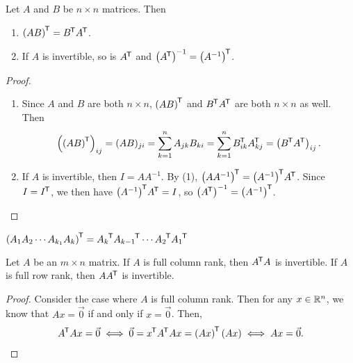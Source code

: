 \begin{thm}\label{transpose-properties}
    Let $A$ and $B$ be $n \times n$ matrices. Then
    \begin{enumerate}[label=(\arabic*)]
        \item ${\left(AB\right)}^{\mkern-1.5mu\mathsf{T}} = {B}^{\mkern-1.5mu\mathsf{T}}{A}^{\mkern-1.5mu\mathsf{T}}$.
        \item If $A$ is invertible, so is ${A}^{\mkern-1.5mu\mathsf{T}}$ and $\left({A}^{\mkern-1.5mu\mathsf{T}}\right)^{-1} = {\left(A^{-1}\right)}^{\mkern-1.5mu\mathsf{T}}$.
    \end{enumerate}
\end{thm}

\begin{proof}\proofbreak
    \begin{enumerate}[label=(\arabic*)]
        \item Since $A$ and $B$ are both $n \times n$, ${(AB)}^{\mkern-1.5mu\mathsf{T}}$ and ${B}^{\mkern-1.5mu\mathsf{T}}{A}^{\mkern-1.5mu\mathsf{T}}$ are both $n \times n$ as well. Then \[\left({\left(AB\right)}^{\mkern-1.5mu\mathsf{T}}\right)_{ij} = (AB)_{ji} = \sum_{k=1}^{n}A_{jk}B_{ki} = \sum_{k=1}^{n}{B}^{\mkern-1.5mu\mathsf{T}}_{ik}{A}^{\mkern-1.5mu\mathsf{T}}_{kj} = \left({B}^{\mkern-1.5mu\mathsf{T}}{A}^{\mkern-1.5mu\mathsf{T}}\right)_{ij}.\]
        \item If $A$ is invertible, then $I = AA^{-1}$. By (1), ${\left(AA^{-1}\right)}^{\mkern-1.5mu\mathsf{T}} = {\left(A^{-1}\right)}^{\mkern-1.5mu\mathsf{T}}{A}^{\mkern-1.5mu\mathsf{T}}$. Since $I = {I}^{\mkern-1.5mu\mathsf{T}}$, we then have ${\left(A^{-1}\right)}^{\mkern-1.5mu\mathsf{T}}{A}^{\mkern-1.5mu\mathsf{T}} = I$, so $\left({A}^{\mkern-1.5mu\mathsf{T}}\right)^{-1} = {\left(A^{-1}\right)}^{\mkern-1.5mu\mathsf{T}}$.
    \end{enumerate}
\end{proof}

\begin{cor}\label{transpose-of-product}
    ${\left(A_1A_2\cdots A_{k_1}A_k\right)}^{\mkern-1.5mu\mathsf{T}} = {A_k}^{\mkern-1.5mu\mathsf{T}}{A_{k-1}}^{\mkern-1.5mu\mathsf{T}}\cdots {A_2}^{\mkern-1.5mu\mathsf{T}}{A_1}^{\mkern-1.5mu\mathsf{T}}$
\end{cor}

\begin{thm}
    Let $A$ be an $m \times n$ matrix. If $A$ is full column rank, then ${A}^{\mkern-1.5mu\mathsf{T}}A$ is invertible. If $A$ is full row rank, then $A{A}^{\mkern-1.5mu\mathsf{T}}$ is invertible.
\end{thm}

\begin{proof}
    Consider the case where $A$ is full column rank. Then for any $x \in \mathbb{R}^n$, we know that $Ax = \vec{0}$ if and only if $x = \vec{0}$. Then,
    \begin{align*}
        {A}^{\mkern-1.5mu\mathsf{T}}Ax = \vec{0} \iff \vec{0} = {x}^{\mkern-1.5mu\mathsf{T}}{A}^{\mkern-1.5mu\mathsf{T}}Ax = {\left(Ax\right)}^{\mkern-1.5mu\mathsf{T}}\left(Ax\right) \iff Ax = \vec{0}.
    \end{align*}
\end{proof}

